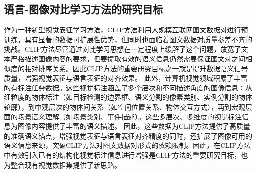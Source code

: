 
\subsection{语言-图像对比学习方法的研究目标}
\label{sec:clip-target}
作为一种新型视觉表征学习方法，CLIP方法利用大规模互联网图文数据对进行预训练，具有显著的数据可扩展性优势，但同时也面临着图文数据对质量参差不齐的挑战。CLIP方法尽管通过对比学习思想在一定程度上缓解了这个问题，放宽了文本严格描述图像内容的要求，但要提取有效的语义信息仍然需要保证图文对之间相似度的相对排序关系。因此CLIP方法的重要研究目标之一就是提升数据语义信号质量，增强视觉表征与语言表征的对齐效果。
此外，计算机视觉领域积累了丰富的有标注任务数据。这些视觉标注涵盖了多个层次和不同描述角度的图像信息：从细粒度的物体标注（如目标检测的边界框、语义分割的像素类别、实例分割的物体轮廓），到中观层次的物体间关系（如空间位置关系、物体交互方式），再到宏观层面的场景语义理解（如场景类别、事件描述）。这些多层次、多维度的视觉标注信息为图像内容提供了丰富的语义描述。
因此，这些数据为CLIP方法提供了高质量的准确语义锚点，增强视觉表征与语言表征对齐精度的同时，还扩展了图像可用的语义信息来源，突破CLIP方法对图文数据对形式的依赖限制。因此，在CLIP方法中有效引入已有的结构化视觉标注信息进行增强是CLIP方法的重要研究目标，也为整合现有视觉数据集提供了新思路。


